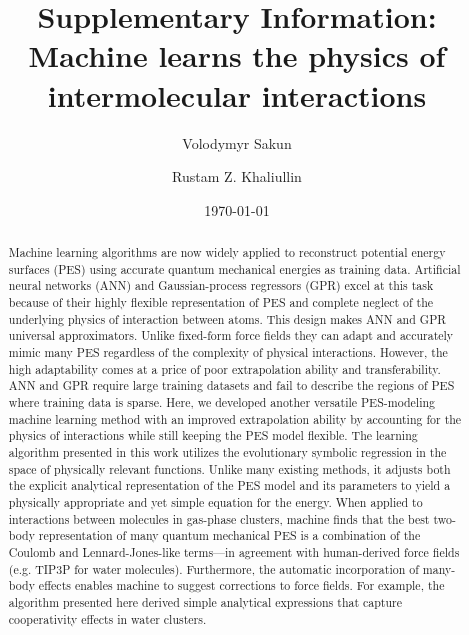 \documentclass[aps,prl,reprint,amsmath,amssymb,nature]{revtex4-1}
\newcommand*{\MAINTEXT}{}
\begin{document}
\newcommand{\Ang}{\ensuremath{\mathring{\text{A}}}}
\newcommand{\red}{\color{red}}
\newcommand{\blue}{\color{blue}}
\newcommand{\old}{\color{black}}




\title{
\ifdefined\MAINTEXT
\else
Supplementary Information: \\
\fi
Machine learns the physics of intermolecular interactions
}

\author{Volodymyr Sakun}
\author{Rustam Z. Khaliullin}

\date{\today}

\ifdefined\MAINTEXT

\begin{abstract}
Machine learning algorithms are now widely applied to reconstruct potential energy surfaces (PES) using accurate quantum mechanical energies as training data. Artificial neural networks (ANN) and Gaussian-process regressors (GPR) excel at this task because of their highly flexible representation of PES and complete neglect of the underlying physics of interaction between atoms. This design makes ANN and GPR universal approximators. Unlike fixed-form force fields they can adapt and accurately mimic many PES regardless of the complexity of physical interactions. However, the high adaptability comes at a price of poor extrapolation ability and transferability. ANN and GPR require large training datasets and fail to describe the regions of PES where training data is sparse. Here, we developed another versatile PES-modeling machine learning method with an improved extrapolation ability by accounting for the physics of interactions while still keeping the PES model flexible. The learning algorithm presented in this work utilizes the evolutionary symbolic regression in the space of physically relevant functions. Unlike many existing methods, it adjusts both the explicit analytical representation of the PES model and its parameters to yield a physically appropriate and yet simple equation for the energy. When applied to interactions between molecules in gas-phase clusters, machine finds that the best two-body representation of many quantum mechanical PES is a combination of the Coulomb and Lennard-Jones-like terms---in agreement with human-derived force fields (e.g. TIP3P for water molecules). Furthermore, the automatic incorporation of many-body effects enables machine to suggest corrections to force fields. For example, the algorithm presented here derived simple analytical expressions that capture cooperativity effects in water clusters.
\end{abstract}
\end{document}

